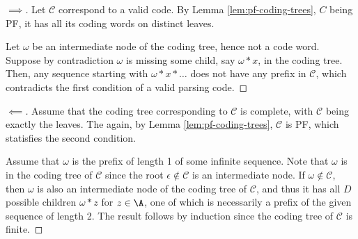 \documentclass[toc, titlepaged]{../cs-classes/cs-classes}
\begin{document}
\begin{proof}[$\implies$]
    Let $\mathcal{C}$ correspond to a valid code. By Lemma \ref{lem:pf-coding-trees}, $C$ being PF, it has all its coding words on distinct leaves. 
    
    Let $\omega$ be an intermediate node of the coding tree, hence not a code word. Suppose by contradiction $\omega$ is missing some child, say $\omega*x$, in the coding tree. Then, any sequence starting with $\omega*x*\dots$ does not have any prefix in $\mathcal{C}$, which contradicts the first condition of a valid parsing code.
\end{proof}

\begin{proof}[$\impliedby$]
    Assume that the coding tree corresponding to $\mathcal{C}$ is complete, with $\mathcal{C}$ being exactly the leaves. The again, by Lemma \ref{lem:pf-coding-trees}, $\mathcal{C}$ is PF, which statisfies the second condition.

    Assume that $\omega$ is the prefix of length 1 of some infinite sequence. Note that $\omega$ is in the coding tree of $\mathcal{C}$ since the root $\epsilon\notin\mathcal{C}$ is an intermediate node. If $\omega\notin\mathcal{C}$, then $\omega$ is also an intermediate node of the coding tree of $\mathcal{C}$, and thus it has all $D$ possible children $\omega*z$ for $z\in\A$, one of which is necessarily a prefix of the given sequence of length 2. The result follows by induction since the coding tree of $\mathcal{C}$ is finite.
\end{proof}
\end{document}
